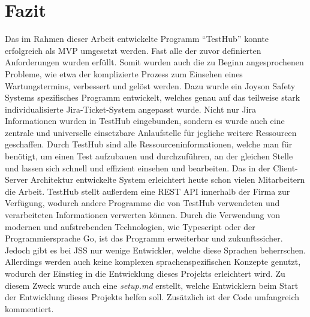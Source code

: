 \section{Fazit}

Das im Rahmen dieser Arbeit entwickelte Programm ``TestHub'' konnte erfolgreich 
als \gls{MVP} umgesetzt werden. Fast alle der zuvor definierten Anforderungen wurden
erfüllt. Somit wurden auch die zu Beginn angesprochenen Probleme, wie etwa der 
komplizierte Prozess zum Einsehen eines Wartungstermins, verbessert und gelöst werden.
Dazu wurde ein Joyson Safety Systems spezifisches Programm entwickelt, welches
genau auf das teilweise stark individualisierte Jira-Ticket-System angepasst wurde. 
Nicht nur Jira Informationen wurden in TestHub eingebunden, sondern es wurde auch 
eine zentrale und universelle einsetzbare Anlaufstelle für jegliche weitere 
Ressourcen geschaffen. Durch TestHub sind alle Ressourceninformationen, welche
man für benötigt, um einen Test aufzubauen und durchzuführen, an der gleichen Stelle 
und lassen sich schnell und effizient einsehen und bearbeiten. Das in der 
Client-Server Architektur entwickelte System erleichtert heute schon vielen Mitarbeitern
die Arbeit. TestHub stellt außerdem eine \gls{REST} \gls{API} innerhalb der Firma 
zur Verfügung, wodurch andere Programme die von TestHub verwendeten und verarbeiteten 
Informationen verwerten können. Durch die Verwendung von modernen und aufstrebenden Technologien,
wie Typescript oder der Programmiersprache Go, ist das Programm erweiterbar 
und zukunftssicher.\\

Jedoch gibt es bei \gls{JSS} nur wenige Entwickler, welche diese Sprachen beherrschen.
Allerdings werden auch keine komplexen sprachenspezifischen Konzepte genutzt, wodurch
der Einstieg in die Entwicklung dieses Projekts erleichtert wird. Zu diesem Zweck
wurde auch eine \textit{setup.md} erstellt, welche Entwicklern beim Start der
Entwicklung dieses Projekts helfen soll. Zusätzlich ist der Code umfangreich kommentiert.

